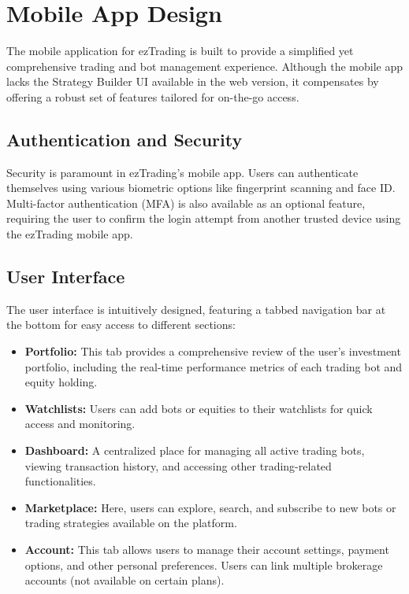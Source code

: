 \section{Mobile App Design}
\label{sec:mobile-app-design}

The mobile application for ezTrading is built to provide a simplified yet comprehensive trading and bot management experience. Although the mobile app lacks the Strategy Builder UI available in the web version, it compensates by offering a robust set of features tailored for on-the-go access.

\subsection{Authentication and Security}
\label{subsec:authentication-security}

Security is paramount in ezTrading's mobile app. Users can authenticate themselves using various biometric options like fingerprint scanning and face ID. Multi-factor authentication (MFA) is also available as an optional feature, requiring the user to confirm the login attempt from another trusted device using the ezTrading mobile app.

\subsection{User Interface}
\label{subsec:user-interface}

The user interface is intuitively designed, featuring a tabbed navigation bar at the bottom for easy access to different sections:

\begin{itemize}
    \item \textbf{Portfolio:} This tab provides a comprehensive review of the user's investment portfolio, including the real-time performance metrics of each trading bot and equity holding.
    
    \item \textbf{Watchlists:} Users can add bots or equities to their watchlists for quick access and monitoring.
    
    \item \textbf{Dashboard:} A centralized place for managing all active trading bots, viewing transaction history, and accessing other trading-related functionalities.
    
    \item \textbf{Marketplace:} Here, users can explore, search, and subscribe to new bots or trading strategies available on the platform.
    
    \item \textbf{Account:} This tab allows users to manage their account settings, payment options, and other personal preferences. Users can link multiple brokerage accounts (not available on certain plans).
\end{itemize}

